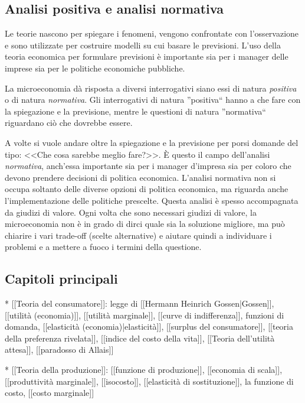 \subsection{Analisi positiva e analisi normativa}

Le teorie nascono per spiegare i fenomeni, vengono confrontate con 
l'osservazione e sono utilizzate per costruire modelli su cui basare le 
previsioni. L'uso della teoria economica per formulare previsioni è importante 
sia per i manager delle imprese sia per le politiche economiche pubbliche. 

La microeconomia dà risposta a diversi interrogativi siano essi di natura 
\emph{positiva} o di natura \emph{normativa}. Gli interrogativi di natura 
''positiva`` hanno a che fare con la spiegazione e la previsione, mentre le 
questioni di natura ''normativa`` riguardano ciò che dovrebbe essere.

A volte si vuole andare oltre la spiegazione e la previsione per porsi domande 
del tipo: <<Che cosa sarebbe meglio fare?>>. 
È questo il campo dell'analisi \emph{normativa}, anch'essa importante sia per i 
manager d'impresa sia per coloro che devono prendere decisioni di politica 
economica. 
L'analisi normativa non si occupa soltanto delle diverse opzioni di politica 
economica, ma riguarda anche l'implementazione delle politiche prescelte. Questa 
analisi è spesso accompagnata da giudizi di valore. Ogni volta che sono 
necessari giudizi di valore, la microeconomia non è in grado di dirci quale sia 
la soluzione migliore, ma può chiarire i vari trade-off (scelte alternative) e 
aiutare quindi a individuare i problemi e a mettere a fuoco i termini della 
questione.

\subsection{Capitoli principali}


* [[Teoria del consumatore]]: legge di [[Hermann Heinrich Gossen|Gossen]], 
[[utilità (economia)]], [[utilità marginale]], [[curve di indifferenza]], 
funzioni di domanda, [[elasticità (economia)|elasticità]], [[surplus del 
consumatore]], [[teoria della preferenza rivelata]], [[indice del costo della 
vita]], [[Teoria dell'utilità attesa]], [[paradosso di Allais]]

* [[Teoria della produzione]]: [[funzione di produzione]], [[economia di 
scala]], [[produttività marginale]], [[isocosto]], [[elasticità di 
sostituzione]], la funzione di costo, [[costo marginale]]

